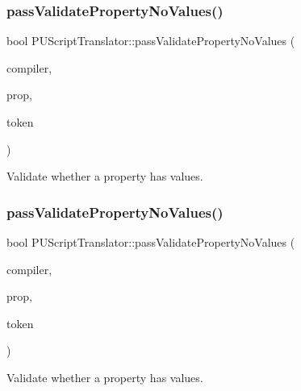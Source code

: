 \subsubsection{\texorpdfstring{pass\+Validate\+Property\+No\+Values()}{passValidatePropertyNoValues()}\hspace{0.1cm}{\footnotesize\ttfamily [1/2]}}
{\footnotesize\ttfamily bool P\+U\+Script\+Translator\+::pass\+Validate\+Property\+No\+Values (\begin{DoxyParamCaption}\item[{\hyperlink{classPUScriptCompiler}{P\+U\+Script\+Compiler} $\ast$}]{compiler,  }\item[{\hyperlink{classPUPropertyAbstractNode}{P\+U\+Property\+Abstract\+Node} $\ast$}]{prop,  }\item[{const std\+::string \&}]{token }\end{DoxyParamCaption})}

Validate whether a property has values. \mbox{\label{classPUScriptTranslator_a34528983a36a1a977b597354fd2e1db3}} 
\subsubsection{\texorpdfstring{pass\+Validate\+Property\+No\+Values()}{passValidatePropertyNoValues()}\hspace{0.1cm}{\footnotesize\ttfamily [2/2]}}
{\footnotesize\ttfamily bool P\+U\+Script\+Translator\+::pass\+Validate\+Property\+No\+Values (\begin{DoxyParamCaption}\item[{\hyperlink{classPUScriptCompiler}{P\+U\+Script\+Compiler} $\ast$}]{compiler,  }\item[{\hyperlink{classPUPropertyAbstractNode}{P\+U\+Property\+Abstract\+Node} $\ast$}]{prop,  }\item[{const std\+::string \&}]{token }\end{DoxyParamCaption})}

Validate whether a property has values. \mbox{\label{classPUScriptTranslator_aef77b0acaa2bc43fb6d59eb4f4484e72}} 

